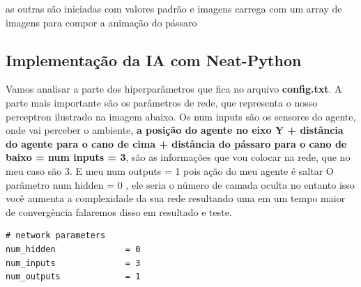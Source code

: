 as outras são iniciadas com valores padrão e imagens carrega com um array de imagens para compor a animação do pássaro








%
\subsection{\textbf{Implementação da IA com Neat-Python}}
Vamos analisar a parte dos hiperparâmetros que fica no arquivo \textbf{config.txt}.
A parte mais importante são os parâmetros de rede,
que representa o nosso perceptron ilustrado na imagem abaixo.
Os num inputs são os sensores do agente, onde vai
perceber o ambiente, \textbf{a posição do agente no eixo Y + distância do agente para o cano de cima + distância do pássaro para o cano de baixo = num inputs = 3}, são as informações que vou colocar na rede, 
que no meu caso são 3.
E meu num outputs = 1 pois ação do meu agente é saltar
O parâmetro num hidden = 0 , ele seria o número de camada oculta no entanto isso você aumenta a complexidade da sua rede resultando uma em um tempo maior de convergência falaremos disso em resultado e teste. 
\begin{lstlisting}
# network parameters
num_hidden              = 0
num_inputs              = 3
num_outputs             = 1
\end{lstlisting}

